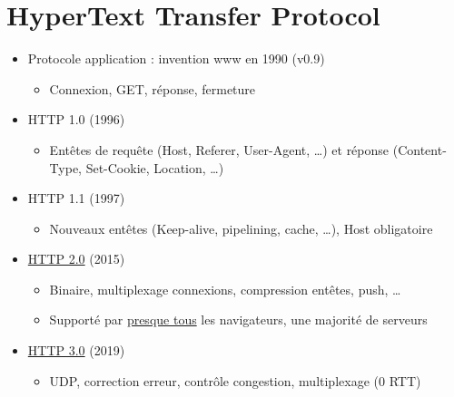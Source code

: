 \hypertarget{hypertext-transfer-protocol}{%
\section{HyperText Transfer
Protocol}\label{hypertext-transfer-protocol}}

\begin{itemize}
\tightlist
\item
  Protocole application : invention www en 1990 (v0.9)

  \begin{itemize}
  \tightlist
  \item
    Connexion, GET, réponse, fermeture
  \end{itemize}
\item
  HTTP 1.0 (1996)

  \begin{itemize}
  \tightlist
  \item
    Entêtes de requête (Host, Referer, User-Agent, \ldots) et réponse
    (Content-Type, Set-Cookie, Location, \ldots)
  \end{itemize}
\item
  HTTP 1.1 (1997)

  \begin{itemize}
  \tightlist
  \item
    Nouveaux entêtes (Keep-alive, pipelining, cache, \ldots), Host
    obligatoire
  \end{itemize}
\item
  \href{https://docs.google.com/presentation/d/1eqae3OBCxwWswOsaWMAWRpqnmrVVrAfPQclfSqPkXrA/present\#slide=id.p19}{HTTP
  2.0} (2015)

  \begin{itemize}
  \tightlist
  \item
    Binaire, multiplexage connexions, compression entêtes, push,
    \ldots{}
  \item
    Supporté par \href{http://caniuse.com/\#feat=http2}{presque tous}
    les navigateurs, une majorité de serveurs
  \end{itemize}
\item
  \href{https://http3-explained.haxx.se/fr/}{HTTP 3.0} (2019)

  \begin{itemize}
  \tightlist
  \item
    UDP, correction erreur, contrôle congestion, multiplexage (0 RTT)
  \end{itemize}
\end{itemize}

